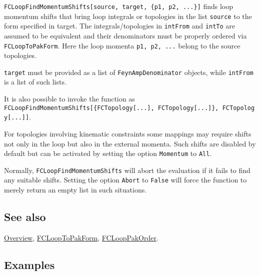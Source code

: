 \documentclass[../FeynCalcManual.tex]{subfiles}
\begin{document}
\texttt{FCLoopFindMomentumShifts[\allowbreak{}source,\ \allowbreak{}target,\ \allowbreak{}\{\allowbreak{}p1,\ \allowbreak{}p2,\ \allowbreak{}...\}]}
finds loop momentum shifts that bring loop integrals or topologies in
the list \texttt{source} to the form specified in target. The
integrals/topologies in \texttt{intFrom} and \texttt{intTo} are assumed
to be equivalent and their denominators must be properly ordered via
\texttt{FCLoopToPakForm}. Here the loop momenta
\texttt{p1,\ \allowbreak{}p2,\ \allowbreak{}...} belong to the source
topologies.

\texttt{target} must be provided as a list of
\texttt{FeynAmpDenominator} objects, while \texttt{intFrom} is a list of
such lists.

It is also possible to invoke the function as
\texttt{FCLoopFindMomentumShifts[\allowbreak{}\{\allowbreak{}FCTopology[\allowbreak{}...],\ \allowbreak{}FCTopology[\allowbreak{}...]\},\ \allowbreak{}FCTopology[\allowbreak{}...]]}.

For topologies involving kinematic constraints some mappings may require
shifts not only in the loop but also in the external momenta. Such
shifts are disabled by default but can be activated by setting the
option \texttt{Momentum} to \texttt{All}.

Normally, \texttt{FCLoopFindMomentumShifts} will abort the evaluation if
it fails to find any suitable shifts. Setting the option \texttt{Abort}
to \texttt{False} will force the function to merely return an empty list
in such situations.

\subsection{See also}

\hyperlink{toc}{Overview}, \hyperlink{fclooptopakform}{FCLoopToPakForm},
\hyperlink{fclooppakorder}{FCLoopPakOrder}.

\subsection{Examples}

\begin{Shaded}
\begin{Highlighting}[]
\ExtensionTok{=} \OperatorTok{\{\{}\OperatorTok{[}\OperatorTok{],}\OperatorTok{[}\OperatorTok{],}\OperatorTok{[}\SpecialCharTok{{-}}\SpecialCharTok{{-}}\OperatorTok{],} 
\OperatorTok{[\{}\SpecialCharTok{{-}}\OperatorTok{,}\OperatorTok{\}],}\OperatorTok{[\{}\OperatorTok{,}\OperatorTok{\}],}\OperatorTok{[}\SpecialCharTok{+}\OperatorTok{],} 
\OperatorTok{[}\SpecialCharTok{+}\OperatorTok{]\}\}}
\end{Highlighting}
\end{Shaded}
\end{document}
